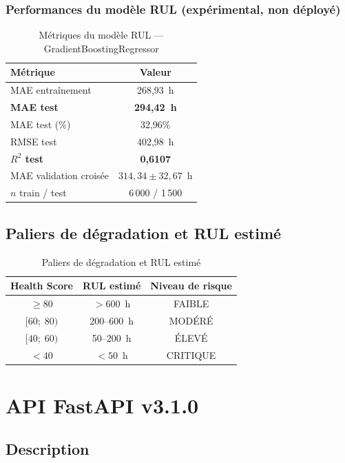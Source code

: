 \documentclass[12pt,a4paper]{report}
\begin{document}
\subsubsection{Performances du modèle RUL (expérimental, non déployé)}

\begin{table}[H]
\centering
\caption{Métriques du modèle RUL — GradientBoostingRegressor}
\begin{tabular}{lc}
\toprule
\textbf{Métrique} & \textbf{Valeur} \\
\midrule
MAE entraînement      & 268,93~h \\
\textbf{MAE test}     & \textbf{294,42~h} \\
MAE test (\%)         & 32,96\% \\
RMSE test             & 402,98~h \\
\textbf{$R^2$ test}   & \textbf{0,6107} \\
MAE validation croisée & $314{,}34 \pm 32{,}67$~h \\
$n$ train / test      & 6\,000 / 1\,500 \\
\bottomrule
\end{tabular}
\end{table}

\subsection{Paliers de dégradation et RUL estimé}

\begin{table}[H]
\centering
\caption{Paliers de dégradation et RUL estimé}
\begin{tabular}{ccc}
\toprule
\textbf{Health Score} & \textbf{RUL estimé} & \textbf{Niveau de risque} \\
\midrule
$\geq 80$        & $> 600$~h    & FAIBLE   \\
$[60;\; 80)$     & 200--600~h   & MODÉRÉ   \\
$[40;\; 60)$     & 50--200~h    & ÉLEVÉ    \\
$< 40$           & $< 50$~h     & CRITIQUE \\
\bottomrule
\end{tabular}
\end{table}

\section{API FastAPI v3.1.0}

\subsection{Description}
\end{document}
